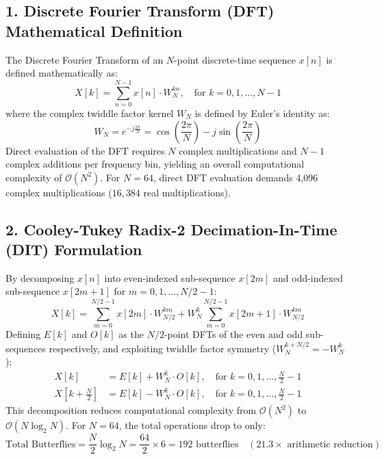 \documentclass[10pt,a4paper]{article}
\begin{document}
\subsection*{1. Discrete Fourier Transform (DFT) Mathematical Definition}
The Discrete Fourier Transform of an $N$-point discrete-time sequence $x[n]$ is defined mathematically as:
\begin{equation}
X[k] = \sum_{n=0}^{N-1} x[n] \cdot W_N^{kn}, \quad \text{for } k = 0, 1, \dots, N - 1
\end{equation}
where the complex twiddle factor kernel $W_N$ is defined by Euler's identity as:
\begin{equation}
W_N = e^{-j \frac{2\pi}{N}} = \cos\left(\frac{2\pi}{N}\right) - j \sin\left(\frac{2\pi}{N}\right)
\end{equation}
Direct evaluation of the DFT requires $N$ complex multiplications and $N - 1$ complex additions per frequency bin, yielding an overall computational complexity of $\mathcal{O}(N^2)$. For $N = 64$, direct DFT evaluation demands 4,096 complex multiplications ($16,384$ real multiplications).

\subsection*{2. Cooley-Tukey Radix-2 Decimation-In-Time (DIT) Formulation}
By decomposing $x[n]$ into even-indexed sub-sequence $x[2m]$ and odd-indexed sub-sequence $x[2m+1]$ for $m = 0, 1, \dots, N/2 - 1$:
\begin{equation}
X[k] = \sum_{m=0}^{N/2-1} x[2m] \cdot W_{N/2}^{km} + W_N^k \sum_{m=0}^{N/2-1} x[2m+1] \cdot W_{N/2}^{km}
\end{equation}
Defining $E[k]$ and $O[k]$ as the $N/2$-point DFTs of the even and odd sub-sequences respectively, and exploiting twiddle factor symmetry ($W_N^{k + N/2} = -W_N^k$):
\begin{align}
X[k]         &= E[k] + W_N^k \cdot O[k], \quad \text{for } k = 0, 1, \dots, \frac{N}{2} - 1 \\
X\left[k + \frac{N}{2}\right] &= E[k] - W_N^k \cdot O[k], \quad \text{for } k = 0, 1, \dots, \frac{N}{2} - 1
\end{align}
This decomposition reduces computational complexity from $\mathcal{O}(N^2)$ to $\mathcal{O}(N \log_2 N)$. For $N = 64$, the total operations drop to only:
\begin{equation}
\text{Total Butterflies} = \frac{N}{2} \log_2 N = \frac{64}{2} \times 6 = 192\text{ butterflies} \quad (21.3\times\text{ arithmetic reduction})
\end{equation}
\end{document}
